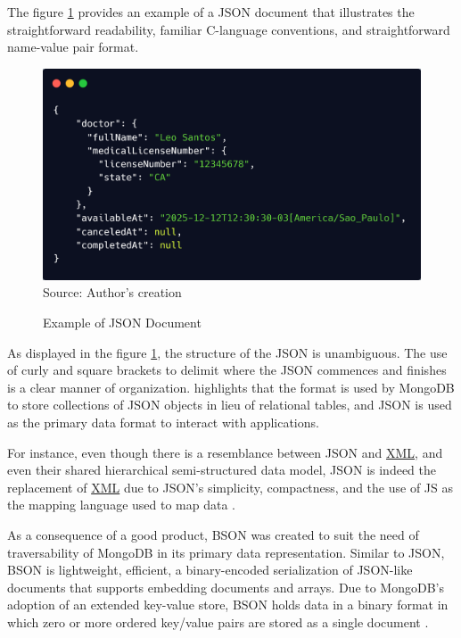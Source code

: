 The figure \ref{fig:json} provides an example of a JSON document that illustrates the straightforward readability, 
familiar C-language conventions, and straightforward name-value pair format.

\begin{figure}[H]
     \centering
     \caption{Example of JSON Document}
     \includegraphics[width=1\linewidth]{figures/db/json.png}
     \label{fig:json}
     \footnotesize Source: Author's creation
\end{figure}

As displayed in the figure \ref{fig:json}, the structure of the JSON is unambiguous. The use of curly and square brackets to delimit where the JSON commences and finishes is a clear manner of organization. \cite{chasseur2013enabling} highlights that the format is used by MongoDB to store collections of JSON objects in lieu of relational tables, and JSON is used as the primary data format to interact with applications.

For instance, even though there is a resemblance between JSON and \hyperref[appendix:glossary]{XML}, and even their shared hierarchical semi-structured data model, JSON is indeed the replacement of \hyperref[appendix:glossary]{XML} due to JSON's simplicity, compactness, and the use of JS as the mapping language used to map data \cite{chasseur2013enabling}.
 
 As a consequence of a good product, BSON was created to suit the need of traversability of MongoDB in its primary data representation. Similar to JSON, BSON is lightweight, efficient, a binary-encoded serialization of JSON-like documents that supports embedding documents and arrays. Due to MongoDB's adoption of an extended key-value store, BSON holds data in a binary format in which zero or more ordered key/value pairs are stored as a single document \cite{bsonspecimplementation2025, bsonspec2025, bsonspecversion112025, davoudianchenliu2018}. 
 
